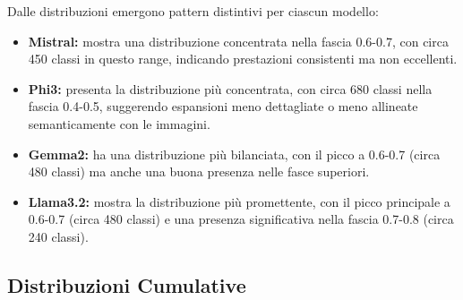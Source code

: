 \documentclass{article}
\begin{document}
Dalle distribuzioni emergono pattern distintivi per ciascun modello:
\begin{itemize}
    \item \textbf{Mistral:} mostra una distribuzione concentrata nella fascia 0.6-0.7, con circa 450 classi in questo range, indicando prestazioni consistenti ma non eccellenti.
    \item \textbf{Phi3:} presenta la distribuzione più concentrata, con circa 680 classi nella fascia 0.4-0.5, suggerendo espansioni meno dettagliate o meno allineate semanticamente con le immagini.
    \item \textbf{Gemma2:} ha una distribuzione più bilanciata, con il picco a 0.6-0.7 (circa 480 classi) ma anche una buona presenza nelle fasce superiori.
    \item \textbf{Llama3.2:} mostra la distribuzione più promettente, con il picco principale a 0.6-0.7 (circa 480 classi) e una presenza significativa nella fascia 0.7-0.8 (circa 240 classi).
\end{itemize}


\subsection{Distribuzioni Cumulative}
\end{document}
